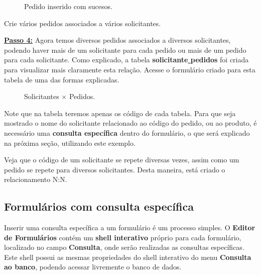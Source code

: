 \documentclass[9pt]{report}
\begin{document}
{       \begin{figure}[H]
        \caption{Pedido inserido com sucesos.}
        \label{fig:sucesspedido}
       \end{figure}

       Crie vários pedidos associados a vários solicitantes.

       \underline{\textbf{Passo 4:}} Agora temos diversos pedidos
       associados a diversos solicitantes, podendo haver mais de um
       solicitante para cada pedido ou mais de um pedido para cada
       solicitante. Como explicado, a tabela
       \textbf{solicitante\underline{ }pedidos} foi criada para
       visualizar mais claramente esta relação. Acesse o formulário
       criado para esta tabela de uma das formas explicadas.
       
       \begin{figure}[H]
        \caption{Solicitantes $\times$ Pedidos.}
        \label{fig:solicitpedidos}
       \end{figure}

       Note que na tabela teremos apenas os código de cada tabela.
       Para que seja mostrado o nome do solicitante relacionado ao
       código do pedido, ou ao produto, é necessário uma
       \textbf{consulta específica} dentro do formulário, o que será
       explicado na próxima seção, utilizando este exemplo.

       Veja que o código de um solicitante se repete diversas vezes,
       assim como um pedido se repete para diversos solicitantes.
       Desta maneira, está criado o relacionamento N:N.

      \subsection{Formulários com consulta específica}

      Inserir uma consulta específica a um formulário é um processo
      simples. O \textbf{Editor de Formulários} contém um
      \textbf{shell interativo} próprio para cada formulário,
      localizado no campo \textbf{Consulta},  onde serão realizadas
      as consultas específicas. Este shell possui as mesmas
      propriedades do shell interativo do menu
      \textbf{Consulta ao banco}, podendo acessar livremente o banco
      de dados.
      
}
\end{document}
